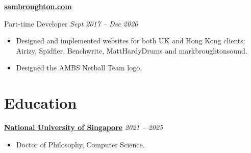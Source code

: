 \documentclass[10pt]{article} %
\begin{document}
\begin{changemargin}{0pt}{0.5pt}
\begin{minipage}[t]{0.5\textwidth}
\begin{changemargin}{5pt}{5pt}

\vspace{5pt}
\underline{\textbf{sambroughton.com}}\\
\par
\vspace{-10pt}
Part-time Developer \textit{\hfill Sept 2017 -- Dec 2020}\\
\vspace{-10pt}

\begin{itemize} \itemsep-2pt %
  \item Designed and implemented websites for both UK and Hong Kong clients: Airizy, Spidfier, Benchwrite, MattHardyDrums and markbroughtonsound. 
  \item Designed the AMBS Netball Team logo.
  
\end{itemize}


\end{changemargin}
\end{minipage} %
\hfill
\begin{minipage}[t]{0.44\textwidth} %
\vspace{0pt} %


\section{Education}

\begin{changemargin}{5pt}{5pt}

\vspace{5pt}
\underline{\textbf{National University of Singapore}} \hfill \textit{ 2021 --  2025}\\
\par
\vspace{-15pt}

\begin{itemize} \itemsep-2pt %
	\item Doctor of Philosophy, Computer Science.


\end{itemize}
\end{changemargin}
\end{minipage}
\end{changemargin}
\end{document}
